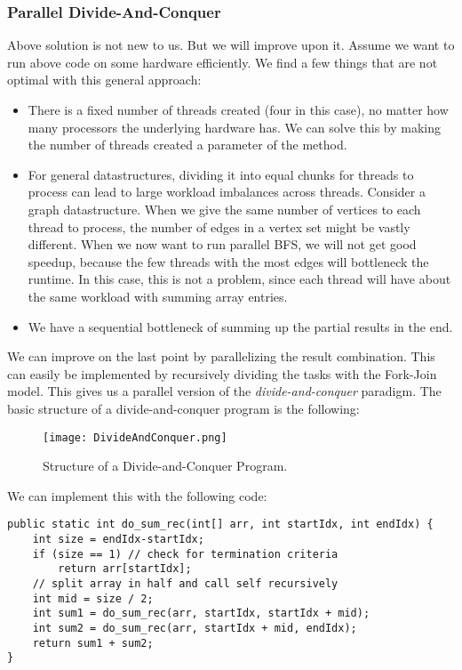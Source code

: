 \documentclass[main.tex]{subfiles}
\begin{document}
\subsubsection{Parallel Divide-And-Conquer}
Above solution is not new to us. But we will improve upon it. Assume we want to run above code on some hardware efficiently. We find a few things that are not optimal with this general approach:
\begin{itemize}
  \item There is a fixed number of threads created (four in this case), no matter how many processors the underlying hardware has. We can solve this by making the number of threads created a parameter of the method.
  \item For general datastructures, dividing it into equal chunks for threads to process can lead to large workload imbalances across threads. Consider a graph datastructure. When we give the same number of vertices to each thread to process, the number of edges in a vertex set might be vastly different. When we now want to run parallel BFS, we will not get good speedup, because the few threads with the most edges will bottleneck the runtime. In this case, this is not a problem, since each thread will have about the same workload with summing array entries.
  \item We have a sequential bottleneck of summing up the partial results in the end.
\end{itemize}
We can improve on the last point by parallelizing the result combination. This can easily be implemented by recursively dividing the tasks with the Fork-Join model. This gives us a parallel version of the \textit{divide-and-conquer} paradigm. The basic structure of a divide-and-conquer program is the following:
\begin{figure}[H]
    \centering
    \texttt{[image: DivideAndConquer.png]}
    \caption{Structure of a Divide-and-Conquer Program.}
\end{figure}
\noindent We can implement this with the following code:
\begin{verbatim}
public static int do_sum_rec(int[] arr, int startIdx, int endIdx) {
    int size = endIdx-startIdx;
    if (size == 1) // check for termination criteria
        return arr[startIdx];
    // split array in half and call self recursively
    int mid = size / 2;
    int sum1 = do_sum_rec(arr, startIdx, startIdx + mid);
    int sum2 = do_sum_rec(arr, startIdx + mid, endIdx);
    return sum1 + sum2;
}
\end{verbatim}
\end{document}
